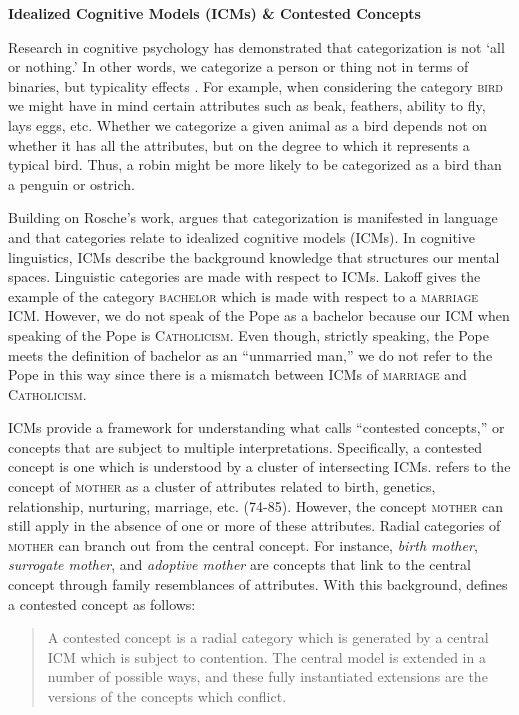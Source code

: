 \textbf{Idealized Cognitive Models (ICMs) \& Contested Concepts}

Research in cognitive psychology has demonstrated that categorization is not `all or nothing.' In other words, we categorize a person or thing not in terms of binaries, but typicality effects \citep{Rosch1973a,Rosch1975a}. For example, when considering the category \textsc{bird} we might have in mind certain attributes such as beak, feathers, ability to fly, lays eggs, etc. Whether we categorize a given animal as a bird depends not on whether it has all the attributes, but on the degree to which it represents a typical bird. Thus, a robin might be more likely to be categorized as a bird than a penguin or ostrich. 

Building on Rosche's work, \cite{Lakoff1987} argues that categorization is manifested in language and that categories relate to idealized cognitive models (ICMs). In cognitive linguistics, ICMs describe the background knowledge that structures our mental spaces. Linguistic categories are made with respect to ICMs. Lakoff gives the example of the category \textsc{bachelor} which is made with respect to a \textsc{marriage} ICM. However, we do not speak of the Pope as a bachelor because our ICM when speaking of the Pope is \textsc{Catholicism}. Even though, strictly speaking, the Pope meets the definition of bachelor as an ``unmarried man,'' we do not refer to the Pope in this way since there is a mismatch between ICMs of \textsc{marriage} and \textsc{Catholicism}.

ICMs provide a framework for understanding what \cite{Gallie1955} calls ``contested concepts,'' or concepts that are subject to multiple interpretations. Specifically, a contested concept is one which is understood by a cluster of intersecting ICMs. \cite{Lakoff1987} refers to the concept of \textsc{mother} as a cluster of attributes related to birth, genetics, relationship, nurturing, marriage, etc. (74-85). However, the concept \textsc{mother} can still apply in the absence of one or more of these attributes. Radial categories of \textsc{mother} can branch out from the central concept. For instance, \textit{birth mother}, \textit{surrogate mother}, and \textit{adoptive mother} are concepts that link to the central concept through family resemblances of attributes. With this background, \cite[22]{Schwartz1992} defines a contested concept as follows:

\begin{quote}
A contested concept is a radial category which is generated by a central ICM which is subject to contention. The central model is extended in a number of possible ways, and these fully instantiated extensions are the versions of the concepts which conflict.
\end{quote}

